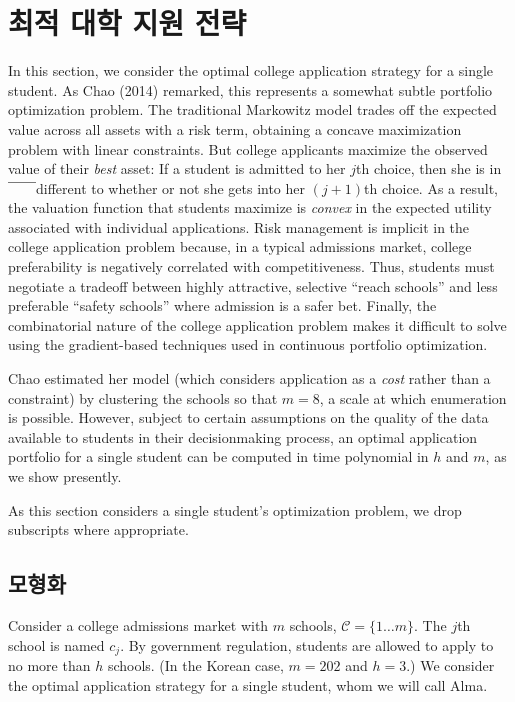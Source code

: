 \documentclass[12pt]{article} %
\newif\ifEN
\theoremstyle{definition}
\theoremstyle{definition}
\begin{document}
\ifEN \section{The optimal college application strategy}  \else \section{최적 대학 지원 전략} \fi \label{optimalcollegeappstrat}
In this section, we consider the optimal college application strategy for a single student. As Chao (2014) remarked, this represents a somewhat subtle portfolio optimization problem. The traditional Markowitz model trades off the expected value across all assets with a risk term, obtaining a concave maximization problem with linear constraints. But college applicants maximize the observed value of their \emph{best} asset: If a student is admitted to her $j$th choice, then she is in￣￣different to whether or not she gets into her $(j+1)$th choice. As a result, the valuation function that students maximize is \emph{convex} in the expected utility associated with individual applications. Risk management is implicit in the college application problem because, in a typical admissions market, college preferability is negatively correlated with competitiveness. Thus, students must negotiate a tradeoff between highly attractive, selective “reach schools” and less preferable “safety schools” where admission is a safer bet. Finally, the combinatorial nature of the college application problem makes it difficult to solve using the gradient-based techniques used in continuous portfolio optimization.

Chao estimated her model (which considers application as a \emph{cost} rather than a constraint) by clustering the schools so that $m=8$, a scale at which enumeration is possible. However, subject to certain assumptions on the quality of the data available to students in their decisionmaking process, an optimal application portfolio for a single student can be computed in time polynomial in $h$ and $m$, as we show presently.

As this section considers a single student’s optimization problem, we drop subscripts where appropriate. 

\ifEN \subsection{Problem formulation}  \else \subsection{모형화} \fi
Consider a college admissions market with $m$ schools, $\mathcal{C} = \{ 1 \dots m\}$. The $j$th school is named $c_j$. By government regulation, students are allowed to apply to no more than $h$ schools. (In the Korean case, $m=202$ and $h=3$.) We consider the optimal application strategy for a single student, whom we will call Alma.
\end{document}
